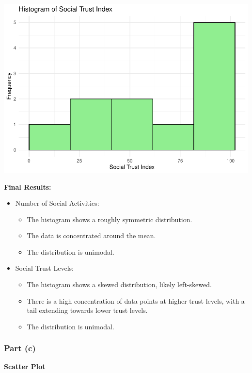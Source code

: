 \documentclass[
  11pt,
]{article}
\providecommand{\tightlist}{%
  \setlength{\itemsep}{0pt}\setlength{\parskip}{0pt}}
\begin{document}
\includegraphics{Answers-PS1_files/figure-latex/unnamed-chunk-6-1.pdf}

\textbf{Final Results:}

\begin{itemize}
\tightlist
\item
  Number of Social Activities:

  \begin{itemize}
  \tightlist
  \item
    The histogram shows a roughly symmetric distribution.
  \item
    The data is concentrated around the mean.
  \item
    The distribution is unimodal.
  \end{itemize}
\item
  Social Trust Levels:

  \begin{itemize}
  \tightlist
  \item
    The histogram shows a skewed distribution, likely left-skewed.
  \item
    There is a high concentration of data points at higher trust levels,
    with a tail extending towards lower trust levels.
  \item
    The distribution is unimodal.
  \end{itemize}
\end{itemize}

\subsubsection{Part (c)}\label{part-c}

\textbf{Scatter Plot}
\end{document}
